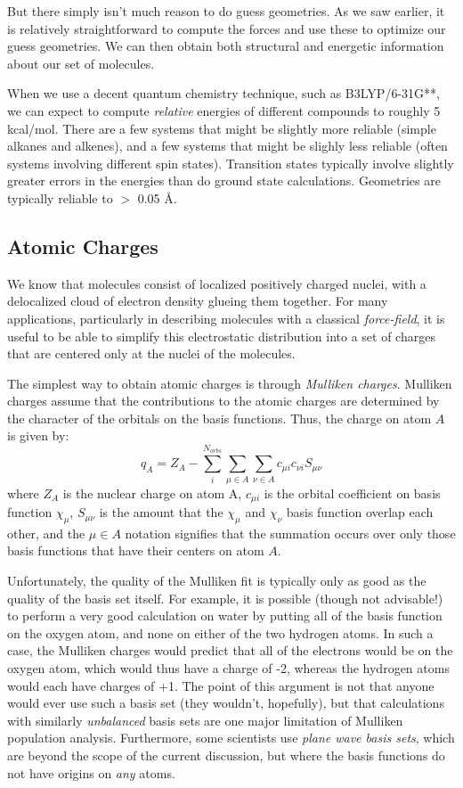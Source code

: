 But there simply isn't much reason to do guess geometries. As we saw
earlier, it is relatively straightforward to compute the forces and
use these to optimize our guess geometries. We can then obtain both
structural and energetic information about our set of molecules.

When we use a decent quantum chemistry technique, such as
B3LYP/6-31G**, we can expect to compute \emph{relative} energies of
different compounds to roughly 5 kcal/mol. There are a few systems
that might be slightly more reliable (simple alkanes and alkenes), and
a few systems that might be slighly less reliable (often systems
involving different spin states). Transition states typically involve
slightly greater errors in the energies than do ground state
calculations. Geometries are typically reliable to $>$ 0.05 \AA.

\subsection{Atomic Charges}

We know that molecules consist of localized positively charged nuclei,
with a delocalized cloud of electron density glueing them
together. For many applications, particularly in describing molecules
with a classical \emph{force-field}, it is useful to be able to
simplify this electrostatic distribution into a set of charges that
are centered only at the nuclei of the molecules. 

The simplest way to obtain atomic charges is through \emph{Mulliken
charges}. Mulliken charges assume that the contributions to the atomic
charges are determined by the character of the orbitals on the basis
functions. Thus, the charge on atom $A$ is given by:
\begin{equation}
	q_A = Z_A - \sum_i^{N_{orbs}} \sum_{\mu\in A} \sum_{\nu\in A} 
		c_{\mu i}c_{\nu i}S_{\mu\nu}
\end{equation}
where $Z_A$ is the nuclear charge on atom A, $c_{\mu i}$ is
the orbital coefficient on basis function $\chi_\mu$, $S_{\mu\nu}$ is
the amount that the $\chi_\mu$ and $\chi_\nu$ basis function overlap
each other, and the $\mu\in A$ notation signifies that the summation
occurs over only those basis functions that have their centers on atom
$A$.

Unfortunately, the quality of the Mulliken fit is typically only as
good as the quality of the basis set itself. For example, it is
possible (though not advisable!) to perform a very good calculation on
water by putting all of the basis function on the oxygen atom, and
none on either of the two hydrogen atoms. In such a case, the Mulliken
charges would predict that all of the electrons would be on the oxygen
atom, which would thus have a charge of -2, whereas the hydrogen atoms
would each have charges of +1. The point of this argument is not that
anyone would ever use such a basis set (they wouldn't, hopefully), but
that calculations with similarly \emph{unbalanced} basis sets are one
major limitation of Mulliken population analysis. Furthermore, some
scientists use \emph{plane wave basis sets}, which are beyond the
scope of the current discussion, but where the basis functions do not
have origins on \emph{any} atoms.

